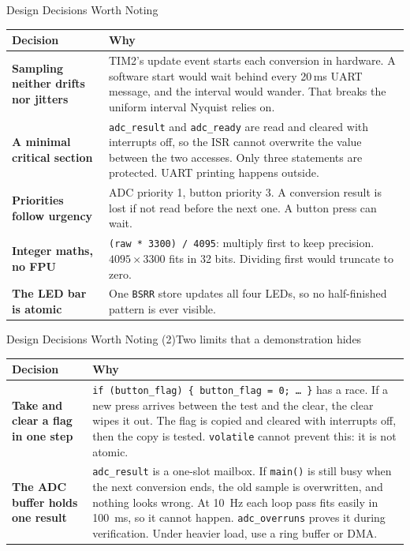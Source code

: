 \documentclass[9pt,aspectratio=169,xcolor=table]{beamer}
\begin{document}
\begin{frame}{Design Decisions Worth Noting}
    \begin{center}
    {\footnotesize
    \striped
    \begin{tabular}{@{}l R{.7\textwidth}@{}}
        \toprule
        \textbf{Decision} & \textbf{Why} \\
        \midrule
        \textbf{Sampling neither drifts nor jitters} & TIM2's update event starts each conversion in hardware. A software start would wait behind every 20\,ms UART message, and the interval would wander. That breaks the uniform interval Nyquist relies on. \\
        \textbf{A minimal critical section} & \texttt{adc\_result} and \texttt{adc\_ready} are read and cleared with interrupts off, so the ISR cannot overwrite the value between the two accesses. Only three statements are protected. UART printing happens outside. \\
        \textbf{Priorities follow urgency} & ADC priority 1, button priority 3. A conversion result is lost if not read before the next one. A button press can wait. \\
        \textbf{Integer maths, no FPU} & \texttt{(raw * 3300) / 4095}: multiply first to keep precision. $4095\times3300$ fits in 32 bits. Dividing first would truncate to zero. \\
        \textbf{The LED bar is atomic} & One \texttt{BSRR} store updates all four LEDs, so no half-finished pattern is ever visible. \\
        \bottomrule
    \end{tabular}}
    \end{center}
\end{frame}

\begin{frame}{Design Decisions Worth Noting (2)}{Two limits that a demonstration hides}
    \begin{center}
    {\footnotesize
    \striped
    \begin{tabular}{@{}l R{.7\textwidth}@{}}
        \toprule
        \textbf{Decision} & \textbf{Why} \\
        \midrule
        \textbf{Take and clear a flag in one step} & \texttt{if (button\_flag) \{ button\_flag = 0; \ldots\ \}} has a race. If a new press arrives between the test and the clear, the clear wipes it out. The flag is copied and cleared with interrupts off, then the copy is tested. \texttt{volatile} cannot prevent this: it is not atomic. \\
        \textbf{The ADC buffer holds one result} & \texttt{adc\_result} is a one-slot mailbox. If \texttt{main()} is still busy when the next conversion ends, the old sample is overwritten, and nothing looks wrong. At 10~Hz each loop pass fits easily in 100~ms, so it cannot happen. \texttt{adc\_overruns} proves it during verification. Under heavier load, use a ring buffer or DMA. \\
        \bottomrule
    \end{tabular}}
    \end{center}
\end{frame}
\end{document}
